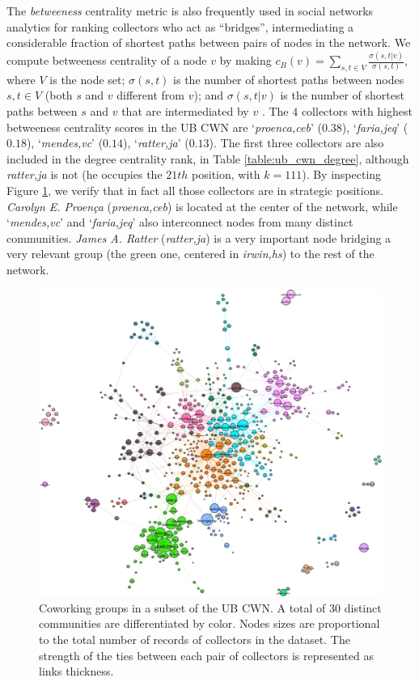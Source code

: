 The \textit{betweeness} centrality metric is also frequently used in social networks analytics for ranking collectors who act as ``bridges'', intermediating a considerable fraction of shortest paths between pairs of nodes in the network. 
We compute betweeness centrality of a node $v$ by making $c_B(v) =\sum_{s,t \in V} \frac{\sigma(s, t|v)}{\sigma(s, t)}$, where $V$ is the node set; $\sigma(s,t)$ is the number of shortest paths between nodes $s, t \in V$ (both $s$ and $v$ different from $v$); and $\sigma(s,t|v)$ is the number of shortest paths between $s$ and $v$ that are intermediated by $v$ \cite{Brandes2008}. 
The $4$ collectors with highest betweeness centrality scores in the UB CWN are `\textit{proenca,ceb}' ($0.38$), `\textit{faria,jeq}' ($0.18$), `\textit{mendes,vc}' ($0.14$), `\textit{ratter,ja}' ($0.13$).
The first three collectors are also included in the degree centrality rank, in Table \ref{table:ub_cwn_degree}, although \textit{ratter,ja} is not (he occupies the $21th$ position, with $k=111$).
By inspecting Figure \ref{fig:ub_cwn_communities}, we verify that in fact all those collectors are in strategic positions.
\textit{Carolyn E. Proença} (\textit{proenca,ceb}) is located at the center of the network, while `\textit{mendes,vc}' and `\textit{faria,jeq}' also interconnect nodes from many distinct communities.
\textit{James A. Ratter} (\textit{ratter,ja}) is a very important node bridging a very relevant group (the green one, centered in \textit{irwin,hs}) to the rest of the network.

\begin{figure}[h!]
  	\centering
    \includegraphics[width=\linewidth]{figures/casestudy_ub/cwn_communities.pdf}
    \caption[Coworking groups in the UB CWN.]{ Coworking groups in a subset of the UB CWN. A total of $30$ distinct communities are differentiated by color. Nodes sizes are proportional to the total number of records of collectors in the dataset. The strength of the ties between each pair of collectors is represented as links thickness.}
    \label{fig:ub_cwn_communities}
\end{figure}


